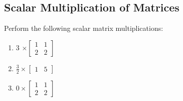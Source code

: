 \documentclass[11pt]{exam}
\begin{document}
    \vspace{20px}
    \subsection{Scalar Multiplication of Matrices}
        \begin{questions}
            \item Perform the following scalar matrix multiplications:
            \begin{enumerate}
                \item 3 $\times \begin{bmatrix} 1 & 1 \\ 2 & 2 \end{bmatrix}$
                \item $\frac{3}{2} \times \begin{bmatrix} 1 & 5 \end{bmatrix}$
                \item $0 \times \begin{bmatrix} 1 & 1 \\ 2 & 2 \end{bmatrix}$
            \end{enumerate}
        \end{questions}

    \pagebreak
\end{document}
